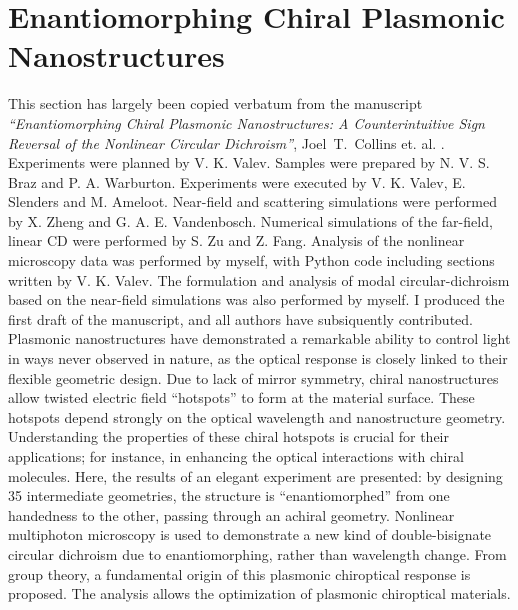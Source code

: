 \chapter{Enantiomorphing Chiral Plasmonic Nanostructures}\label{sec:results:EnantiomorphingChiralCrosses}


This section has largely been copied verbatum from the manuscript \textit{``Enantiomorphing Chiral Plasmonic Nanostructures: A Counterintuitive Sign Reversal of the Nonlinear Circular Dichroism''}, Joel~T.~Collins et. al. \cite{Collins2018}. 
Experiments were planned by V. K. Valev. Samples were prepared by N. V. S. Braz and P. A. Warburton. Experiments were executed by V. K. Valev, E. Slenders and M. Ameloot. Near-field and scattering simulations were performed by X. Zheng and G. A. E. Vandenbosch. Numerical simulations of the far-field, linear CD were performed by S. Zu and Z. Fang. 
Analysis of the nonlinear microscopy data was performed by myself, with Python code including sections written by V. K. Valev. The formulation and analysis of modal circular-dichroism based on the near-field simulations was also performed by myself. I produced the first draft of the manuscript, and all authors have subsiquently contributed. 
\\

Plasmonic nanostructures have demonstrated a remarkable ability to control light in ways never observed in nature, as the optical response is closely linked to their flexible geometric design.
Due to lack of mirror symmetry, chiral nanostructures allow twisted electric field “hotspots” to form at the material surface. 
These hotspots depend strongly on the optical wavelength and nanostructure geometry.
Understanding the properties of these chiral hotspots is crucial for their applications; for instance, in enhancing the optical interactions with chiral molecules. 
Here, the results of an elegant experiment are presented: by designing 35 intermediate geometries, the structure is “enantiomorphed” from one handedness to the other, passing through an achiral geometry. 
Nonlinear multiphoton microscopy is used to demonstrate a new kind of double-bisignate circular dichroism due to enantiomorphing, rather than wavelength change.
From group theory, a fundamental origin of this plasmonic chiroptical response is proposed. The analysis allows the optimization of plasmonic chiroptical materials.

